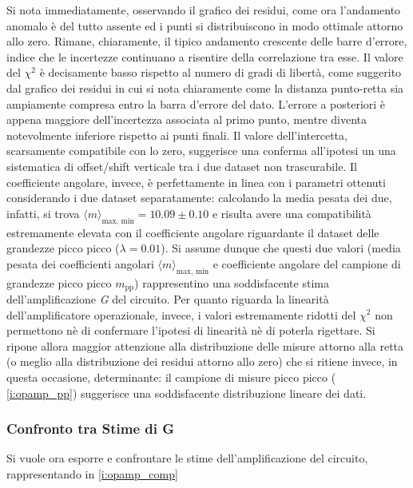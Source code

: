 \documentclass[a4paper,11pt]{article} %
\begin{document}
\noindent Si nota immediatamente, osservando il grafico dei residui, come ora l'andamento anomalo è del tutto assente ed
i punti si distribuiscono in modo ottimale attorno allo zero. Rimane, chiaramente, il tipico andamento crescente delle
barre d'errore, indice che le incertezze continuano a risentire della correlazione tra esse. Il valore del $\chi^2$ è
decisamente basso rispetto al numero di gradi di libertà, come suggerito dal grafico dei residui in cui si nota
chiaramente come la distanza punto-retta sia ampiamente compresa entro la barra d'errore del dato. L'errore a posteriori
è appena maggiore dell'incertezza associata al primo punto, mentre diventa notevolmente inferiore rispetto ai punti
finali. Il valore dell'intercetta, scarsamente compatibile con lo zero, suggerisce una conferma all'ipotesi un una
sistematica di offset/shift verticale tra i due dataset non trascurabile. Il coefficiente angolare, invece, è
perfettamente in linea con i parametri ottenuti considerando i due dataset separatamente: calcolando la media pesata dei
due, infatti, si trova $\langle m\rangle_{\text{max, min}}=10.09 \pm 0.10$ e risulta avere una compatibilità
estremamente elevata con il coefficiente angolare riguardante il dataset delle grandezze picco picco ($\lambda = 0.01$).
Si assume dunque che questi due valori (media pesata dei coefficienti angolari $\langle m\rangle_{\text{max, min}}$ e
coefficiente angolare del campione di grandezze picco picco $m_{\text{pp}}$) rappresentino una soddisfacente stima
dell'amplificazione \textit{G} del circuito. Per quanto riguarda la linearità dell'amplificatore operazionale, invece, i
valori estremamente ridotti del $\chi^2$ non permettono nè di confermare l'ipotesi di linearità nè di poterla rigettare.
Si ripone allora maggior attenzione alla distribuzione delle misure attorno alla retta (o meglio alla distribuzione dei
residui attorno allo zero) che si ritiene invece, in questa occasione, determinante: il campione di misure picco picco
( \autoref{i:opamp_pp}) suggerisce una soddisfacente distribuzione lineare dei dati. 

\subsubsection{Confronto tra Stime di G}
Si vuole ora esporre e confrontare le stime dell'amplificazione del circuito, rappresentando in  \autoref{i:opamp_comp} 
\end{document}
